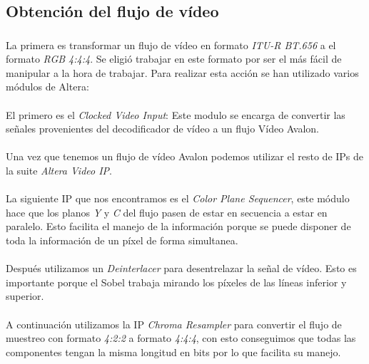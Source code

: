 \documentclass[a4paper,12pt,titlepage,final]{book}
\begin{document}
\subsection{Obtención del flujo de vídeo}
\subsubsection*{}

\paragraph{}
La primera es transformar un flujo de vídeo en formato \textit{ITU-R BT.656} a el formato \textit{RGB 4:4:4}. Se eligió trabajar en este formato por ser el más fácil de manipular a la hora de trabajar. Para realizar esta acción se han utilizado varios módulos de Altera:

\paragraph{}
El primero es el \textit{Clocked Video Input}: Este modulo se encarga de convertir las señales provenientes del decodificador de vídeo a un flujo Vídeo Avalon.

\paragraph{}
Una vez que tenemos un flujo de vídeo Avalon podemos utilizar el resto de IPs de la suite \textit{Altera Video IP}.

\paragraph{}
La siguiente IP que nos encontramos es el \textit{Color Plane Sequencer}, este módulo hace que los planos \textit{Y} y \textit{C} del flujo pasen de estar en secuencia a estar en paralelo. Esto facilita el manejo de la información porque se puede disponer de toda la información de un píxel de forma simultanea.

\paragraph{}
Después utilizamos un \textit{Deinterlacer} para desentrelazar la señal de vídeo. Esto es importante porque el Sobel trabaja mirando los píxeles de las líneas inferior y superior.

\paragraph{}
A continuación utilizamos la IP \textit{Chroma Resampler} para convertir el flujo de muestreo con formato \textit{4:2:2} a formato \textit{4:4:4}, con esto conseguimos que todas las componentes tengan la misma longitud en bits por lo que facilita su manejo.
\end{document}
